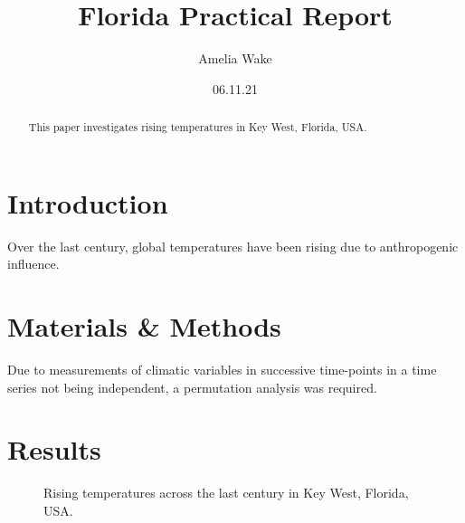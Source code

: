 \documentclass[12pt]{report}
\title{Florida Practical Report}
\author{Amelia Wake}
\date{06.11.21}
\begin{document}
  \maketitle
  
  \begin{abstract}
    This paper investigates rising temperatures in Key West, Florida, USA.
  \end{abstract}
  
  \section{Introduction}
    Over the last century, global temperatures have been rising due to anthropogenic influence. 
  
  \section{Materials \& Methods}
    Due to measurements of climatic variables in successive time-points in a time series not being independent, a permutation analysis was required.
  
  \section{Results}
    \begin{figure}[htbp]
    \caption{Rising temperatures across the last century in Key West, Florida, USA.}
    \label{fig}
    \end{figure}
\end{document}

